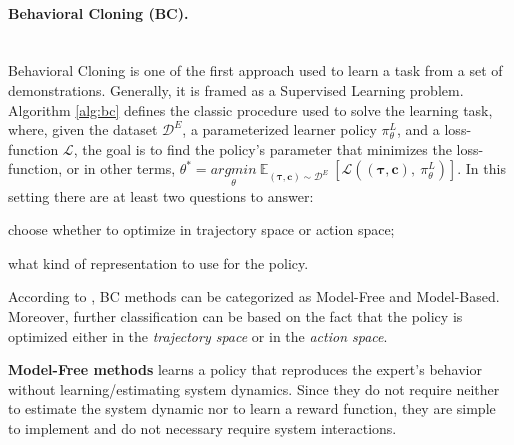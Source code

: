 \paragraph{Behavioral Cloning (BC).} \mbox{} \\ 
Behavioral Cloning is one of the first approach used to learn a task from a set of demonstrations. Generally, it is framed as a Supervised Learning problem. Algorithm \ref{alg:bc} defines the classic procedure used to solve the learning task, where, given the dataset $\mathcal{D}^{E}$, a parameterized learner policy $\pi^{L}_{\theta}$, and a loss-function $\mathcal{L}$, the goal is to find the policy's parameter that minimizes the loss-function, or in other terms, $\theta^{*} = \underset{\theta}{argmin} \ \mathbb{E}_{(\boldsymbol{\tau}, \mathbf{c}) \sim \mathcal{D}^{E}} \ [\mathcal{L}((\boldsymbol{\tau}, \mathbf{c}), \ \pi^{L}_{\theta})]$.
In this setting there are at least two questions to answer: 
\begin{enumerate*}[label=\textbf{(\arabic*)}]
    \item choose whether to optimize in trajectory space or action space;
    \item what kind of representation to use for the policy.
\end{enumerate*}
\newline According to \cite{osa2018algorithmic}, BC methods can be categorized as Model-Free and Model-Based. Moreover, further classification can be based on the fact that the policy is optimized either in the \textit{trajectory space} or in the \textit{action space}. 
 

\textbf{Model-Free methods} learns a policy that reproduces the expert's behavior without learning/estimating system dynamics. Since they do not require neither to estimate the system dynamic nor to learn a reward function, they are simple to implement and do not necessary require system  interactions. 

